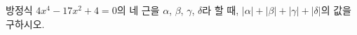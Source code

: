 방정식 $4x^4-17x^2+4=0$의 네 근을 $\alpha$, $\beta$, $\gamma$, $\delta$라 할 때, $|\alpha|+|\beta|+|\gamma|+|\delta|$의 값을 구하시오.
